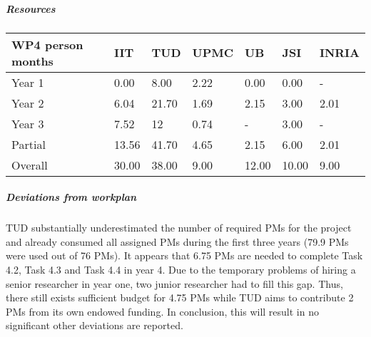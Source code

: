 
\subparagraph{Resources}

\begin{center}
\begin{tabular}{|C{1.5cm}|C{1.5cm}|C{1.5cm}|C{2cm}|C{2cm}|C{2cm}|C{2cm}|}
\hline
\footnotesize \textbf{WP4 person months}& \footnotesize \textbf{IIT}&\footnotesize \textbf{TUD}&\footnotesize \textbf{UPMC}& \footnotesize \textbf{UB} &\footnotesize \textbf{JSI} &\footnotesize \textbf{INRIA}\\ \hline
\footnotesize Year 1  &  0.00  & 8.00 & 2.22 & 0.00 & 0.00 & -     \\  \hline
\footnotesize Year 2  &  6.04  & 21.70 & 1.69 & 2.15 & 3.00 & 2.01     \\  \hline
\footnotesize Year 3  &  7.52  & 12    & 0.74 & -    & 3.00 & -     \\  \hline
\footnotesize Partial &  13.56 & 41.70 & 4.65 & 2.15 & 6.00 & 2.01 \\ \hline \hline
\footnotesize Overall &  30.00 & 38.00 & 9.00 & 12.00 & 10.00 & 9.00 \\ \hline
\end{tabular}
\end{center}

\subparagraph{Deviations from workplan} 
TUD substantially underestimated the number of required PMs for the project and already consumed all assigned PMs during the first three years (79.9 PMs were used out of 76 PMs). It appears that 6.75 PMs are needed to complete Task 4.2, Task 4.3 and Task 4.4 in year 4. Due to the temporary problems of hiring a senior researcher in year one, two junior researcher had to fill this gap. Thus, there still exists sufficient budget for 4.75 PMs while TUD aims to contribute 2 PMs from its own endowed funding. In conclusion, this will result in no significant other deviations are reported.

